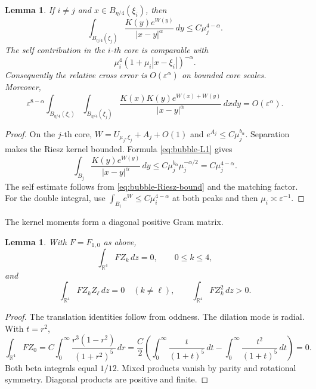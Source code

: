 \documentclass[11pt]{article}
\newtheorem{lemma}[theorem]{Lemma}
\numberwithin{equation}{section}
\begin{document}
\begin{lemma}\label{lem:separated-core-estimates}
If $i\ne j$ and $x\in B_{\eta/4}(\xi_i)$, then
\begin{equation*}
\int_{B_{\eta/4}(\xi_j)}
\frac{K(y)e^{W(y)}}{|x-y|^\alpha}\,dy
\leq C\mu_j^{4-\alpha}.
\end{equation*}
The self contribution in the $i$-th core is comparable with
\[
\mu_i^4(1+\mu_i|x-\xi_i|)^{-\alpha}.
\]
Consequently the relative cross error is $O(\varepsilon^\alpha)$ on bounded core scales. Moreover,
\begin{equation}\label{eq:separated-double}
\varepsilon^{8-\alpha}
\int_{B_{\eta/4}(\xi_i)}
\int_{B_{\eta/4}(\xi_j)}
\frac{K(x)K(y)e^{W(x)+W(y)}}{|x-y|^\alpha}\,dxdy
=O(\varepsilon^\alpha).
\end{equation}
\end{lemma}

\begin{proof}
On the $j$-th core,
$W=U_{\mu_j,\xi_j}+A_j+O(1)$ and
$e^{A_j}\leq C\mu_j^{b_\alpha}$. Separation makes the Riesz kernel bounded. Formula
\eqref{eq:bubble-L1} gives
\[
\int_{B_j}\frac{K(y)e^{W(y)}}{|x-y|^\alpha}\,dy
\leq C\mu_j^{b_\alpha}\mu_j^{-\alpha/2}
=C\mu_j^{4-\alpha}.
\]
The self estimate follows from \eqref{eq:bubble-Riesz-bound} and the matching factor. For the double integral, use
$\int_{B_i}e^W\leq C\mu_i^{4-\alpha}$ at both peaks and then
$\mu_i\asymp\varepsilon^{-1}$.
\end{proof}

The kernel moments form a diagonal positive Gram matrix.

\begin{lemma}\label{lem:kernel-Gram}
With $F=F_{1,0}$ as above,
\begin{equation*}
\int_{\mathbb R^4}FZ_k\,dz=0,
\qquad 0\leq k\leq4,
\end{equation*}
and
\begin{equation*}
\int_{\mathbb R^4}FZ_kZ_\ell\,dz=0\quad(k\ne\ell),
\qquad
\int_{\mathbb R^4}FZ_k^2\,dz>0.
\end{equation*}
\end{lemma}

\begin{proof}
The translation identities follow from oddness. The dilation mode is radial. With $t=r^2$,
\[
\int_{\mathbb R^4}FZ_0
=C\int_0^\infty\frac{r^3(1-r^2)}{(1+r^2)^5}\,dr
=\frac C2\left(
\int_0^\infty\frac{t}{(1+t)^5}\,dt
-\int_0^\infty\frac{t^2}{(1+t)^5}\,dt
\right)=0.
\]
Both beta integrals equal $1/12$. Mixed products vanish by parity and rotational symmetry. Diagonal products are positive and finite.
\end{proof}
\end{document}

